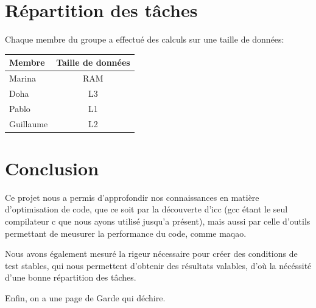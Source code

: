 \section*{Répartition des tâches}
Chaque membre du groupe a effectué des calculs sur une taille de données:
\begin{tabular}{ l | c }
    Membre & Taille de données \\\hline
    Marina & RAM \\
    Doha & L3\\
    Pablo & L1\\
    Guillaume & L2\\
\end{tabular}
\section*{Conclusion}
Ce projet nous a permis d'approfondir nos connaissances en matière d'optimisation de code, que ce soit par la découverte d'icc (gcc étant le seul compilateur c que nous ayons utilisé jusqu'a présent), mais aussi par celle d'outils permettant de meusurer la performance du code, comme maqao.

Nous avons également mesuré la rigeur nécessaire pour créer des conditions de test stables, qui nous permettent d'obtenir des résultats valables, d'où la nécéssité d'une bonne répartition des tâches.

Enfin, on a une page de Garde qui déchire.
